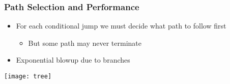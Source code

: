 \begin{frame}
	\frametitle{Path Selection and Performance}
	\begin{itemize}
		\item For each conditional jump we must decide what path to follow first
		\begin{itemize}
			\item But some path may never terminate
		\end{itemize}
		\item Exponential blowup due to branches
	\end{itemize}
	\centering\texttt{[image: tree]}
\end{frame}